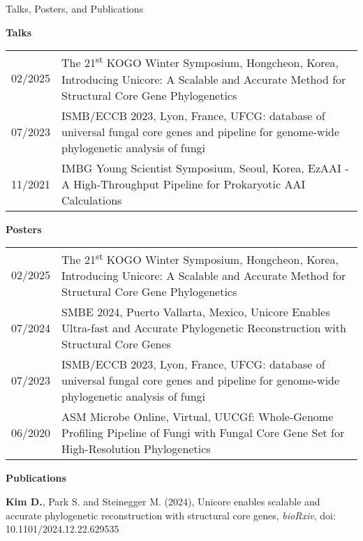 \documentclass{resume} %
\begin{document}
\begin{rSection}{Talks, Posters, and Publications}
\vspace{2mm}

{\bf Talks }\vspace{1mm}

\begin{tabular}{p{2.5cm}p{14.1cm}}
02/2025 & The 21\textsuperscript{st} KOGO Winter Symposium, Hongcheon, Korea, Introducing Unicore: A Scalable and Accurate Method for Structural Core Gene Phylogenetics
\\[1mm]
07/2023 & ISMB/ECCB 2023, Lyon, France, UFCG: database of universal fungal core genes and pipeline for genome-wide phylogenetic analysis of fungi
\\[1mm]
11/2021 & IMBG Young Scientist Symposium, Seoul, Korea, EzAAI - A High-Throughput Pipeline for Prokaryotic AAI Calculations
\\[1mm]
\end{tabular}
\vspace{1mm}

{\bf Posters }\vspace{1mm}

\begin{tabular}{p{2.5cm}p{14.1cm}}
02/2025 & The 21\textsuperscript{st} KOGO Winter Symposium, Hongcheon, Korea, Introducing Unicore: A Scalable and Accurate Method for Structural Core Gene Phylogenetics
\\[1mm]
07/2024 & SMBE 2024, Puerto Vallarta, Mexico, Unicore Enables Ultra-fast and Accurate Phylogenetic Reconstruction with Structural Core Genes
\\[1mm]
07/2023 & ISMB/ECCB 2023, Lyon, France, UFCG: database of universal fungal core genes and pipeline for genome-wide phylogenetic analysis of fungi
\\[1mm]
06/2020 & ASM Microbe Online, Virtual, UUCGf: Whole-Genome Profiling Pipeline of Fungi with Fungal Core Gene Set for High-Resolution Phylogenetics
\\[1mm]
\end{tabular}
\vspace{1mm}


{\bf Publications}\\[-26mm]

\begin{thebibliography}{10}

\vspace{8mm}
{\bf Kim D.}, Park S. and Steinegger M. (2024),
Unicore enables scalable and accurate phylogenetic reconstruction with structural core genes, {\em bioRxiv}, doi: 10.1101/2024.12.22.629535
	

\end{thebibliography}
\end{rSection}
\end{document}
